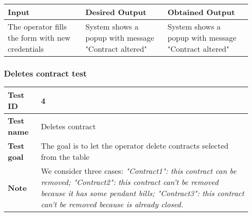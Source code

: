 {{{\begin{center}
			\begin{tabular}{|p{4cm}|p{5cm}|p{5cm}|}
			\hline
			\centering \vspace{1mm} \bfseries{Input} \vspace{1mm} & \vspace{1mm} \bfseries{Desired Output} \vspace{1mm} & \vspace{1mm} \bfseries{Obtained Output} \vspace{1mm}\\
			\hline
				\vspace{1mm} The operator fills the form with new credentials \vspace{1mm} &
				\vspace{1mm} System shows a popup with message "Contract altered" \vspace{1mm} & 
				\vspace{1mm} System shows a popup with message "Contract altered" \vspace{1mm} \\
			\hline
			\end{tabular}
			\end{center}
		}
		\clearpage

		\subsubsection{Deletes contract test}{
			\begin{center}
			\begin{tabular}{|p{4cm}|p{10cm}|}
			\hline
				\centering \vspace{1mm} \bfseries{Test ID} \vspace{1mm} & 
				\vspace{1mm} 4 \vspace{1mm}\\
			\hline
				\centering \vspace{1mm} \bfseries{Test name} \vspace{1mm} & 
				\vspace{1mm} Deletes contract\vspace{1mm}\\
			\hline
				\centering \vspace{1mm} \bfseries{Test goal} \vspace{1mm} & 
				\vspace{1mm} The goal is to let the operator delete contracts selected from the table\vspace{1mm}\\
			\hline
				\centering \vspace{1mm} \bfseries{Note} \vspace{1mm} & 
				\vspace{1mm} We consider three cases: \itshape{"Contract1"}: this contract can be removed; \itshape{"Contract2"}: this contract can't be removed because it has some pendant bills; \itshape{"Contract3"}: this contract can't be removed because is already closed. \vspace{1mm}\\
			\hline
			\end{tabular}


\end{center}}}}
